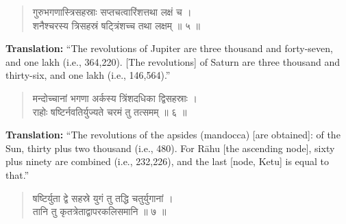 \documentclass[11pt,a4paper]{article}
\newcommand{\dev}[1]{{\devanagarifont #1}}
\newenvironment{sanskritverse}{\begin{verse}\devanagarifont\large\centering}{\end{verse}}
\begin{document}
\vspace{0.5cm}

\begin{tcolorbox}[colback=white,colframe=rulecolor,title={\dev{\textbf{दशगीतिका ५ — गुरुशनैश्चरमन्दोच्चराहुभगणाः}}}]
\begin{sanskritverse}
\dev{गुरुभगणास्त्रिसहस्राः सप्तचत्वारिंशत्तथा लक्षं च ।\\
शनैश्चरस्य त्रिसहस्रं षट्त्रिंशच्च तथा लक्षम् ॥ ५ ॥}
\end{sanskritverse}
\end{tcolorbox}

\vspace{0.3cm}
\noindent\textbf{Translation:} ``The revolutions of Jupiter are three thousand and forty-seven, and one lakh (i.e., 364,220). [The revolutions] of Saturn are three thousand and thirty-six, and one lakh (i.e., 146,564).''

\vspace{0.5cm}

\begin{tcolorbox}[colback=white,colframe=rulecolor,title={\dev{\textbf{दशगीतिका ६ — मन्दोच्चराहुभगणाः}}}]
\begin{sanskritverse}
\dev{मन्दोच्चानां भगणा अर्कस्य त्रिंशदधिका द्विसहस्राः ।\\
राहोः षष्टिर्नवतिर्युज्यते चरमं तु तत्समम् ॥ ६ ॥}
\end{sanskritverse}
\end{tcolorbox}

\vspace{0.3cm}
\noindent\textbf{Translation:} ``The revolutions of the apsides (mandocca) [are obtained]: of the Sun, thirty plus two thousand (i.e., 480). For Rāhu [the ascending node], sixty plus ninety are combined (i.e., 232,226), and the last [node, Ketu] is equal to that.''

\vspace{0.5cm}

\begin{tcolorbox}[colback=white,colframe=rulecolor,title={\dev{\textbf{दशगीतिका ७ — युगमनुकल्पाः}}}]
\begin{sanskritverse}
\dev{षष्टिर्युता द्वे सहस्रे युगं तु तद्धि चतुर्युगानां ।\\
तानि तु कृतत्रेताद्वापरकलिसमानि ॥ ७ ॥}
\end{sanskritverse}
\end{tcolorbox}
\end{document}
